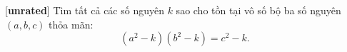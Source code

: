 \documentclass[../04-diophantine-equations.tex]{subfiles}
\begin{document}
\begin{exercise*}\label{example:RUS-2015-TST-D10-P3}[\textbf{unrated}]
	Tìm tất cả các số nguyên \( k \) sao cho tồn tại vô số bộ ba số nguyên \( (a, b, c) \) thỏa mãn:
	\[
		(a^2 - k)(b^2 - k) = c^2 - k.
	\]
\end{exercise*}
\end{document}
